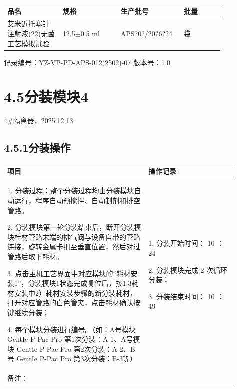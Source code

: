 \documentclass[UTF8,10pt,a4paper,fontset=fandol]{ctexart}
\newcommand{\fieldvalue}[1]{#1}
\newcommand{\handwritten}[1]{#1}
\begin{document}
\noindent
\begin{tabular}{|p{0.22\linewidth}|p{0.23\linewidth}|p{0.25\linewidth}|p{0.16\linewidth}|}
\hline
品名 & 规格 & 生产批号 & 批量 \\
\hline
\fieldvalue{艾米近托塞针注射液(22)无菌工艺模拟试验}
&
\fieldvalue{12.5$\pm$0.5 ml}
&
\fieldvalue{\handwritten{APS?0?/20?6?24}}
&
袋 \\
\hline
\end{tabular}

\noindent
记录编号：YZ-VP-PD-APS-012(2502)-07 \qquad 版本号：1.0

\section*{4.5\quad 分装模块4}
\handwritten{4\#隔离器，2025.12.13}

\subsection*{4.5.1\quad 分装操作}

\noindent
\begin{tabular}{|p{0.56\linewidth}|p{0.35\linewidth}|}
\hline
\textbf{项目} & \textbf{操作记录} \\
\hline
1. 分装过程：整个分装过程均由分装模块自动运行，程序自动预搅拌、自动制剂和排空管路。

2. 分装模块第一轮分装结束后，断开分装模块杜材管路末端的排气阀与设备自带的管路连接，旋转金属卡扣至垂直位置，然后对过管路后取下耗材。

3. 点击主机工艺界面中对应模块的“耗材安装1”，分装模块1状态完成复位后，按1.3耗材安装中2）耗材安装步骤的新分装耗材，打开对应管路的白色管夹，点击耗材确认按键继续分装；

4. 每个模块分装进行编号。（如：A号模块 GentIe P-Pac Pro 第1次分装：A-1、A号模块 GentIe P-Pac Pro 第2次分装：A-2、B号 GentIe P-Pac Pro 第3次分装：B-3等） &
1. 分装开始时间：
\fieldvalue{\handwritten{10}}
：
\fieldvalue{\handwritten{24}}

2. 分装模块完成
\fieldvalue{\handwritten{2}}
次循环分装；

3. 分装结束时间：
\fieldvalue{\handwritten{10}}
：
\fieldvalue{\handwritten{49}} \\
\hline
备注： & \\
\hline
\end{tabular}
\end{document}
